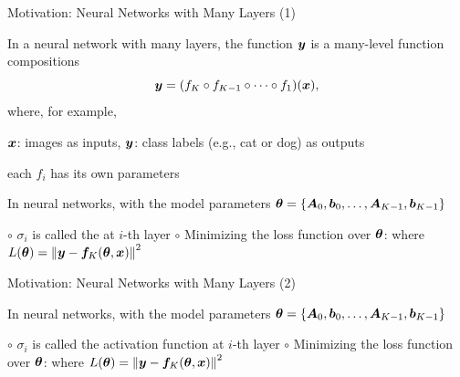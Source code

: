 \documentclass[fleqn,aspectratio=169]{beamer}
\begin{document}
\begin{frame}{Motivation: Neural Networks with Many Layers (1)}

\plitemsep 0.01in

\bci 
\item In a neural network with many layers, the function $\bm{y}$ is a many-level function compositions
$$
\bm{y} = (f_K \circ f_{K-1} \circ \cdots \circ f_1)(\bm{x}),
$$
where, for example,  
\bci
\item $\bm{x}$: images as inputs, $\bm{y}$: class labels (e.g., cat or dog) as outputs
\item each $f_i$ has its own parameters
\eci

\item In neural networks, with the model parameters $\bm{\theta} = \{\bm{A}_0, \bm{b}_0, \ldots, \bm{A}_{K-1}, \bm{b}_{K-1} \}$

\smallskip
{}
{
\small
\vspace{-0.4cm}
$\circ$ $\sigma_i$ is called the  at $i$-th layer
}
{
\hspace{-0.7cm} $\circ$ Minimizing the loss function over $\bm{\theta}$:
where 
$
L(\bm{\theta}) = \left \lVert \bm{y} - \bm{f}_K(\bm{\theta},\bm{x}) \right \rVert^2
$
}

\eci
\end{frame}

\begin{frame}{Motivation: Neural Networks with Many Layers (2)}

\plitemsep 0.01in

\bci 

\item In neural networks, with the model parameters $\bm{\theta} = \{\bm{A}_0, \bm{b}_0, \ldots, \bm{A}_{K-1}, \bm{b}_{K-1} \}$

\smallskip
{}
{
\small
\vspace{-0.4cm}
$\circ$ $\sigma_i$ is called the activation function at $i$-th layer
}
{
\hspace{-0.7cm} $\circ$ Minimizing the loss function over $\bm{\theta}$:
where 
$
L(\bm{\theta}) = \left \lVert \bm{y} - \bm{f}_K(\bm{\theta},\bm{x}) \right \rVert^2
$
}

\medskip
\item \question {}

\eci
\end{frame}
\end{document}
